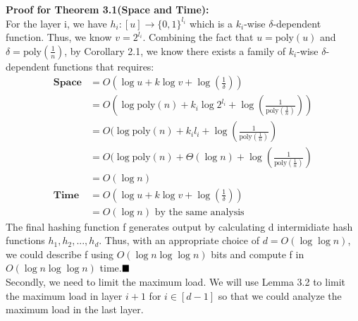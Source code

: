\documentclass[a4paper, english]{paper}
\begin{document}
	\noindent\textbf{Proof for Theorem 3.1(Space and Time):} \\
\quad	For the layer i, we have $h_i:[u]\rightarrow\{0,1\}^{l_i}$ which is a $k_i$-wise $\delta$-dependent function. Thus, we know $v = 2^{l_i}$. Combining the fact that $u = \text{poly}(u)$ and $\delta=\text{poly}(\frac1n)$, by Corollary 2.1, we know there exists a family of $k_i$-wise $\delta$-dependent functions that requires:
\begin{align*}
\textbf{Space} &= O(\log u+k\log v+\log(\frac1\delta))\\
&= O(\log \text{poly}(n) + k_i\log 2^{l_i}+\log(\frac1{\text{poly}(\frac1n)}))\\
&= O(\log \text{poly}(n) + k_il_i+\log(\frac1{\text{poly}(\frac1n)})\\
&= O(\log \text{poly}(n) + \Theta(\log n)+\log(\frac1{\text{poly}(\frac1n)})\\
&= O(\log n)\\
\textbf{Time} &= O(\log u+k\log v+\log(\frac1\delta))\\
&=  O(\log n)\text{ by the same analysis}
\end{align*}
\quad The final hashing function f generates output by calculating d intermidiate hash functions $h_1,h_2,...,h_d$. Thus, with an appropriate choice of $d= O(\log\log n)$, we could describe f using $O(\log n\log\log n)$ bits and compute f in $O(\log n\log\log n)$ time.$\hfill\blacksquare$\\

	Secondly, we need to limit the maximum load. We will use Lemma 3.2 to limit the maximum load in layer $i+1$ for $i\in[d-1]$ so that we could analyze the maximum load in the last layer.\\
	
\end{document}
